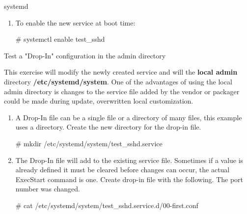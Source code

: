 \begin{Lab}
\begin{exe} {systemd}
\begin{enumerate}
\begin{raw}
# systemctl status test_sshd
test_sshd.service - test
   Loaded: loaded (/usr/lib/systemd/system/test_sshd.service; disabled; vendor preset: disabled)
   Active: active (running) since Mon 2019-08-12 10:50:24 CDT; 2s ago
 Main PID: 5449 (sshd)
    Tasks: 1 (limit: 2356)
   Memory: 1.2M
   CGroup: /system.slice/test_sshd.service
           |_5449 /usr/sbin/sshd -D -oCiphers=aes256-gcm@openssh.com,chacha20-poly1305@openssh.com

Aug 12 10:50:24 rt.example.com systemd[1]: Starting test...
Aug 12 10:50:24 rt.example.com sshd[5449]: Server listening on 0.0.0.0 port 4222.
Aug 12 10:50:24 rt.example.com sshd[5449]: Server listening on :: port 4222.
Aug 12 10:50:24 rt.example.com systemd[1]: Started test.
		\end{raw}
	\item To enable the new service at boot time: 
		\begin{raw}
# systemctl enable test_sshd
		\end{raw} 
	\end{enumerate}
\end{exe} 


\begin{exe}
	{Test a "Drop-In" configuration in the admin directory}

	This exercise will modify the newly created service and will the 
	\textbf{local admin} directory \textbf{/etc/systemd/system}. 
	One of the advantages of using the local admin directory is 
	changes to the service file added by the vendor or 
	packager could be made during update, overwritten local customization.

	\begin{enumerate} 
		\item
		A Drop-In file can be a single file or a directory 
			of many files, this 
			example uses a directory.
		Create the new directory for the drop-in file.
		\begin{raw}
# mkdir /etc/systemd/system/test_sshd.service
		\end{raw}

		\item 
		The Drop-In file will add to the existing service file. Sometimes 
			if a value is already defined it must be cleared before 
			changes can occur, the actual ExecStart command is one. Create 
			drop-in file with the following. The port number was changed. 

		\begin{raw}
# cat /etc/systemd/system/test_sshd.service.d/00-first.conf


\end{raw}
\end{enumerate}
\end{exe}
\end{Lab}
